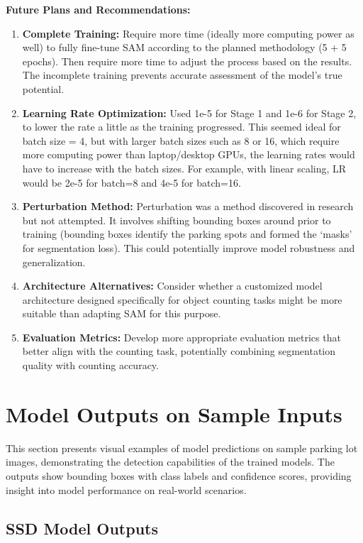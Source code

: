 \documentclass[12pt,a4paper]{article}
\begin{document}
\textbf{Future Plans and Recommendations:}

\begin{enumerate}
    \item \textbf{Complete Training:} Require more time (ideally more computing power as well) to fully fine-tune SAM according to the planned methodology (5 + 5 epochs). Then require more time to adjust the process based on the results. The incomplete training prevents accurate assessment of the model's true potential.
    \item \textbf{Learning Rate Optimization:} Used 1e-5 for Stage 1 and 1e-6 for Stage 2, to lower the rate a little as the training progressed. This seemed ideal for batch size = 4, but with larger batch sizes such as 8 or 16, which require more computing power than laptop/desktop GPUs, the learning rates would have to increase with the batch sizes. For example, with linear scaling, LR would be 2e-5 for batch=8 and 4e-5 for batch=16.
    \item \textbf{Perturbation Method:} Perturbation was a method discovered in research but not attempted. It involves shifting bounding boxes around prior to training (bounding boxes identify the parking spots and formed the `masks' for segmentation loss). This could potentially improve model robustness and generalization.
    \item \textbf{Architecture Alternatives:} Consider whether a customized model architecture designed specifically for object counting tasks might be more suitable than adapting SAM for this purpose.
    \item \textbf{Evaluation Metrics:} Develop more appropriate evaluation metrics that better align with the counting task, potentially combining segmentation quality with counting accuracy.
\end{enumerate}

\section{Model Outputs on Sample Inputs}

This section presents visual examples of model predictions on sample parking lot images, demonstrating the detection capabilities of the trained models. The outputs show bounding boxes with class labels and confidence scores, providing insight into model performance on real-world scenarios.

\subsection{SSD Model Outputs}
\end{document}
